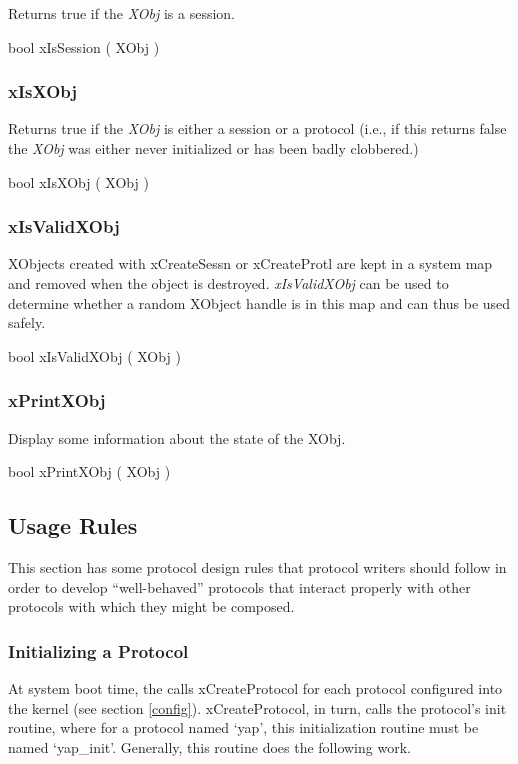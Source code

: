 Returns true if the {\em XObj} is a session.
\medskip

{\sem bool} {\bold xIsSession} ( {\sem XObj} )



\subsubsection{xIsXObj}

Returns true if the {\em XObj} is either a session or a protocol
(i.e., if this returns false the {\em XObj} was either never
initialized or has been badly clobbered.)
\medskip

{\sem bool} {\bold xIsXObj} ( {\sem XObj} )



\subsubsection{xIsValidXObj}

XObjects created with xCreateSessn or xCreateProtl are kept in a
system map and removed when the object is destroyed.  
{\em xIsValidXObj} can be used to determine whether a random 
XObject handle is in this map and can thus be used safely.
\medskip

{\sem bool} {\bold xIsValidXObj} ( {\sem XObj} )


\subsubsection{xPrintXObj}

Display some information about the state of the {\sem XObj}.
\medskip

{\sem bool} {\bold xPrintXObj} ( {\sem XObj} )



\subsection{Usage Rules}

This section has some protocol design rules that protocol writers
should follow in order to develop ``well-behaved'' protocols that
interact properly with other protocols with which they might be
composed.


\subsubsection{Initializing a Protocol}

At system boot time, the \xk{} calls xCreateProtocol for each protocol 
configured into the kernel (see section \ref{config}). 
xCreateProtocol, in turn, 
calls the protocol's init routine,
where for a protocol named `yap', this initialization routine 
must be named `yap\_init'. 
Generally, this routine does the following work.

